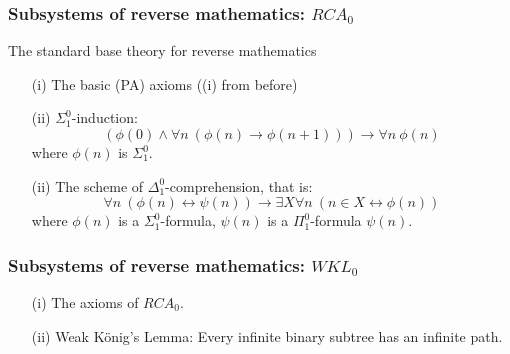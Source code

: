 \documentclass[10pt,danish]{beamer}
\begin{document}
\begin{frame}
 \frametitle{Subsystems of reverse mathematics: $RCA_0$}
The standard base theory for reverse mathematics
\begin{definition}[$RCA_{0}$]
\small
\begin{enumerate}
\item[(i)] The basic (PA) axioms ((i) from before)
\item[(ii)] $\Sigma_1^0$-induction:
\begin{displaymath}
(\phi(0) \land \forall n\  (\phi(n) \rightarrow \phi(n+1))) \rightarrow
\forall n\  \phi(n)
\end{displaymath}
where $\phi(n)$ is $\Sigma_1^0$. 
\item[(ii)] The scheme of $\Delta_{1}^{0}$-comprehension, that is:
\begin{displaymath}
\forall n\ (\phi(n) \leftrightarrow \psi(n)) \rightarrow \exists X
\forall n\  (n \in X \leftrightarrow \phi(n))
\end{displaymath}
where $\phi(n)$ is a $\Sigma_{1}^{0}$-formula, $\psi(n)$ is a
$\Pi_{1}^{0}$-formula
$\psi(n)$.
\end{enumerate}
\end{definition}
\end{frame}

\begin{frame}
 \frametitle{Subsystems of reverse mathematics: $WKL_0$}
\begin{definition}[$WKL_0$]
\begin{itemize}
\item[(i)] The axioms of $RCA_0$.
\item[(ii)] Weak K\"onig's Lemma: Every infinite binary subtree has an infinite path.\\
\end{itemize}
\end{definition}
\end{frame}
\end{document}
